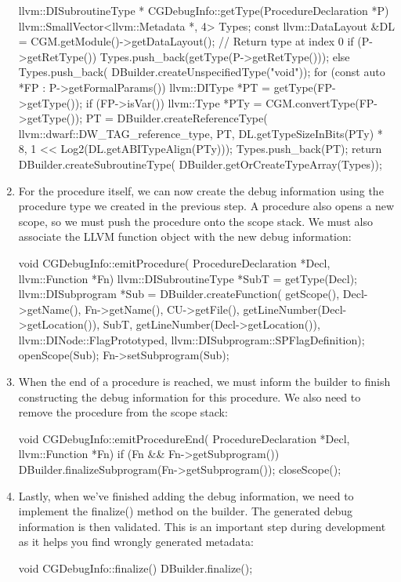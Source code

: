 \begin{enumerate}
\begin{cpp}
llvm::DISubroutineType *
CGDebugInfo::getType(ProcedureDeclaration *P) {
    llvm::SmallVector<llvm::Metadata *, 4> Types;
    const llvm::DataLayout &DL =
        CGM.getModule()->getDataLayout();
    // Return type at index 0
    if (P->getRetType())
        Types.push_back(getType(P->getRetType()));
    else
        Types.push_back(
            DBuilder.createUnspecifiedType("void"));
    for (const auto *FP : P->getFormalParams()) {
        llvm::DIType *PT = getType(FP->getType());
        if (FP->isVar()) {
            llvm::Type *PTy = CGM.convertType(FP->getType());
            PT = DBuilder.createReferenceType(
                llvm::dwarf::DW_TAG_reference_type, PT,
                DL.getTypeSizeInBits(PTy) * 8,
                1 << Log2(DL.getABITypeAlign(PTy)));
        }
        Types.push_back(PT);
    }
    return DBuilder.createSubroutineType(
        DBuilder.getOrCreateTypeArray(Types));
}
\end{cpp}

\item
For the procedure itself, we can now create the debug information using the procedure type we created in the previous step. A procedure also opens a new scope, so we must push the procedure onto the scope stack. We must also associate the LLVM function object with the new debug information:

\begin{cpp}
void CGDebugInfo::emitProcedure(
        ProcedureDeclaration *Decl, llvm::Function *Fn) {
    llvm::DISubroutineType *SubT = getType(Decl);
    llvm::DISubprogram *Sub = DBuilder.createFunction(
        getScope(), Decl->getName(), Fn->getName(),
        CU->getFile(), getLineNumber(Decl->getLocation()),
        SubT, getLineNumber(Decl->getLocation()),
        llvm::DINode::FlagPrototyped,
        llvm::DISubprogram::SPFlagDefinition);
    openScope(Sub);
    Fn->setSubprogram(Sub);
}
\end{cpp}

\item
When the end of a procedure is reached, we must inform the builder to finish constructing the debug information for this procedure. We also need to remove the procedure from the scope stack:

\begin{cpp}
void CGDebugInfo::emitProcedureEnd(
ProcedureDeclaration *Decl, llvm::Function *Fn) {
    if (Fn && Fn->getSubprogram())
        DBuilder.finalizeSubprogram(Fn->getSubprogram());
    closeScope();
}
\end{cpp}

\item
Lastly, when we’ve finished adding the debug information, we need to implement the finalize() method on the builder. The generated debug information is then validated. This is an important step during development as it helps you find wrongly generated metadata:

\begin{cpp}
void CGDebugInfo::finalize() { DBuilder.finalize(); }
\end{cpp}

\end{enumerate}

